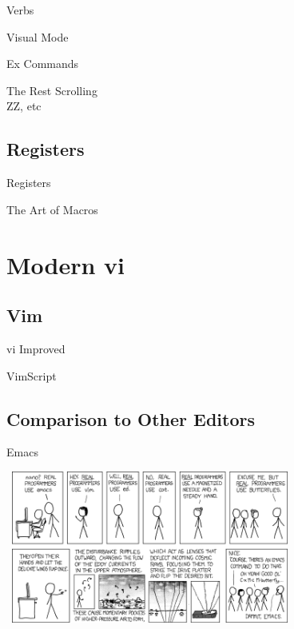 \documentclass{beamer}
\begin{document}
            \begin{frame}{Verbs}
            \end{frame}

            \begin{frame}{Visual Mode}
            \end{frame}

            \begin{frame}{Ex Commands}
            \end{frame}

            \begin{frame}{The Rest}
                Scrolling \\
                ZZ, etc
            \end{frame}

        \subsection{Registers}

            \begin{frame}{Registers}
            \end{frame}

            \begin{frame}{The Art of Macros}
            \end{frame}

    \section{Modern vi}

        \subsection{Vim}

            \begin{frame}{vi Improved}
            \end{frame}

            \begin{frame}{VimScript}
            \end{frame}

        \subsection{Comparison to Other Editors}

            \begin{frame}{Emacs}
                \begin{center}
                \includegraphics[width = 9.5cm, height = 5cm]{real_programmers.png}
                \end{center}
            \end{frame}
\end{document}

